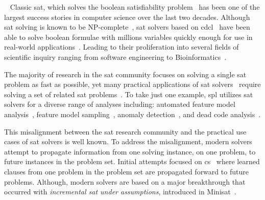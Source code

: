 ~\label{section:motivation}
%
%
Classic \ac{sat}, which solves the boolean satisfiability
problem~\cite{10.5555/1550723} has been one of the largest success stories in
computer science over the last two decades. Although \ac{sat} solving is known
to be NP-complete~\cite{10.1145/800157.805047}, \ac{sat} solvers based on
\ac{cdcl}~\cite{Marques-Silva:1999:GSA:304491.304506,Silva:1997:GNS:244522.244560,10.5555/1867406.1867438}
have been able to solve boolean formulae with millions variables quickly enough
for use in real-world applications~\cite{10.5555/1557461}. Leading to their
proliferation into several fields of scientific inquiry ranging from software
engineering to
Bioinformatics~\cite{10.1007/11814948_16,10.1007/978-3-642-31612-8_12}.

The majority of research in the \ac{sat} community focuses on solving a single
\ac{sat} problem as fast as possible, yet many practical applications of
\ac{sat}
solvers~\cite{silva1997robust,10.1007/3-540-44798-9_4,10.1145/378239.379019,10.1145/1698759.1698762,Een_asingle-instance,een2003temporal,10.5555/1998496.1998520}
require solving a set of related \ac{sat}
problems~\cite{10.1007/3-540-44798-9_4, silva1997robust, een2003temporal}. To
take just one example, \ac{spl} utilizes \ac{sat} solvers for a diverse range of
analyses including: automated feature model
analysis~\cite{useBTRC05,GBT+19,TAK+:CSUR14}, feature model
sampling~\cite{MKR+:ICSE16,VAT+:SPLC18}, anomaly
detection~\cite{AKTS:FOSD16,KAT:TR16,MNS+:SPLC17}, and dead code
analysis~\cite{TLSS:EuroSys11}.

This misalignment between the \ac{sat} research community and the practical use
cases of \ac{sat} solvers is well known. To address the misalignment, modern
solvers attempt to propagate information from one solving instance, on one
problem, to future instances in the problem set. Initial attempts focused on
\ac{cs}~\cite{10.1007/3-540-44798-9_4,10.1145/378239.379019} where learned
clauses from one problem in the problem set are propagated forward to future
problems. Although, modern solvers are based on a major breakthrough that
occurred with \emph{incremental \ac{sat} under assumptions}, introduced in
Minisat~\cite{10.1007/978-3-540-24605-3_37}.

